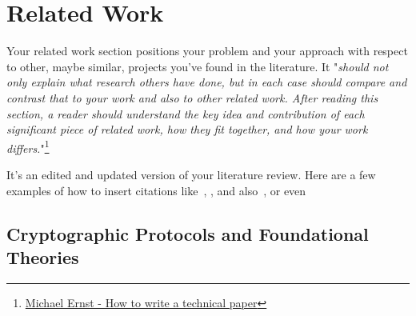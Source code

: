 \documentclass{scrartcl}
\begin{document}
\section{Related Work}

Your related work section positions your problem and your approach with respect to other, maybe similar, projects you've found in the literature.
It "\textit{should not only explain what research others have done, but in each case should compare and contrast that to your work and also to other related work. After reading this section, a reader should understand the key idea and contribution of each significant piece of related work, how they fit together, and how your work differs.}"\footnote{\href{https://homes.cs.washington.edu/~mernst/advice/write-technical-paper.html\#related-work}{Michael Ernst - How to write a technical paper}} 

It's an edited and updated version of your literature review. Here are a few examples of how to insert citations like~\cite{Groth2016}, \cite{Roy2024}, and also~\cite{goldreich1991proofs}, or even~\cite{arun2024jolt}

\subsection{Cryptographic Protocols and Foundational Theories}
\end{document}
